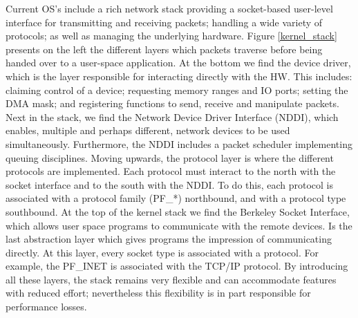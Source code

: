 \documentclass[conference]{IEEEtran}
\begin{document}
Current OS's include a rich network stack providing a socket-based user-level interface for transmitting and receiving packets; handling a wide variety of protocols; as well as managing the underlying hardware. Figure \ref{kernel_stack} presents on the left the different layers which packets traverse before being handed over to a user-space application. At the bottom we find the device driver, which is the layer responsible for interacting directly with the HW. This includes: claiming control of a device; requesting memory ranges and IO ports; setting the DMA mask; and registering functions to send, receive and manipulate packets. Next in the stack, we find the Network Device Driver Interface (NDDI), which enables, multiple and perhaps different, network devices to be used simultaneously. Furthermore, the NDDI includes a packet scheduler implementing queuing disciplines. Moving upwards, the protocol layer is where the different protocols are implemented. Each protocol must interact to the north with the socket interface and to the south with the NDDI. To do this, each protocol is associated with a protocol family (PF\_*) northbound, and with a protocol type southbound. At the top of the kernel stack we find the Berkeley Socket Interface, which allows user space programs to communicate with the remote devices. Is the last abstraction layer which gives programs the impression of communicating directly. At this layer, every socket type is associated with a protocol. For example, the PF\_INET is associated with the TCP/IP protocol. By introducing all these layers, the stack remains very flexible and can accommodate features with reduced effort; nevertheless this flexibility is in part responsible for performance losses.
\end{document}
